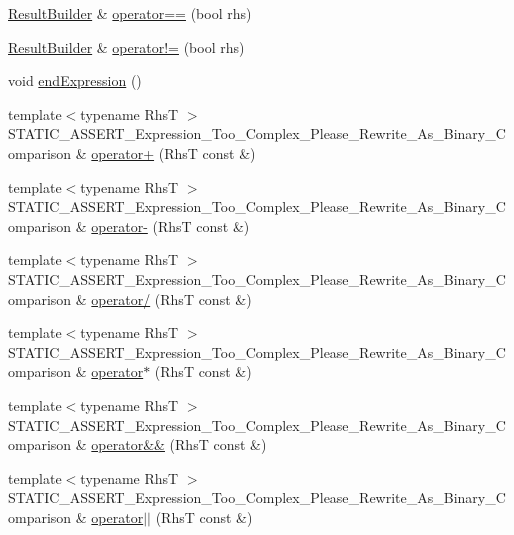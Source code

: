 \begin{DoxyCompactItemize}
\item 
\hyperlink{class_catch_1_1_result_builder}{Result\+Builder} \& \hyperlink{class_catch_1_1_expression_lhs_a6001030bcfbabc3981013ddffb3e3bb6}{operator==} (bool rhs)
\item 
\hyperlink{class_catch_1_1_result_builder}{Result\+Builder} \& \hyperlink{class_catch_1_1_expression_lhs_a71e48da9a894962e8b32a8af5359a4df}{operator!=} (bool rhs)
\item 
void \hyperlink{class_catch_1_1_expression_lhs_a13d2551a927790284fb5ddf1ee2c9079}{end\+Expression} ()
\item 
{\footnotesize template$<$typename RhsT $>$ }\\S\+T\+A\+T\+I\+C\+\_\+\+A\+S\+S\+E\+R\+T\+\_\+\+Expression\+\_\+\+Too\+\_\+\+Complex\+\_\+\+Please\+\_\+\+Rewrite\+\_\+\+As\+\_\+\+Binary\+\_\+\+Comparison \& \hyperlink{class_catch_1_1_expression_lhs_a29ffb8417e977f0a98c0eb537a7ca5af}{operator+} (RhsT const \&)
\item 
{\footnotesize template$<$typename RhsT $>$ }\\S\+T\+A\+T\+I\+C\+\_\+\+A\+S\+S\+E\+R\+T\+\_\+\+Expression\+\_\+\+Too\+\_\+\+Complex\+\_\+\+Please\+\_\+\+Rewrite\+\_\+\+As\+\_\+\+Binary\+\_\+\+Comparison \& \hyperlink{class_catch_1_1_expression_lhs_a19ef0a33442bb18efef1ec65102151d1}{operator-\/} (RhsT const \&)
\item 
{\footnotesize template$<$typename RhsT $>$ }\\S\+T\+A\+T\+I\+C\+\_\+\+A\+S\+S\+E\+R\+T\+\_\+\+Expression\+\_\+\+Too\+\_\+\+Complex\+\_\+\+Please\+\_\+\+Rewrite\+\_\+\+As\+\_\+\+Binary\+\_\+\+Comparison \& \hyperlink{class_catch_1_1_expression_lhs_a37d50565046ac9b1c9159a7c0cf88a1e}{operator/} (RhsT const \&)
\item 
{\footnotesize template$<$typename RhsT $>$ }\\S\+T\+A\+T\+I\+C\+\_\+\+A\+S\+S\+E\+R\+T\+\_\+\+Expression\+\_\+\+Too\+\_\+\+Complex\+\_\+\+Please\+\_\+\+Rewrite\+\_\+\+As\+\_\+\+Binary\+\_\+\+Comparison \& \hyperlink{class_catch_1_1_expression_lhs_a9a94294c22449f62087862ef911e6291}{operator$\ast$} (RhsT const \&)
\item 
{\footnotesize template$<$typename RhsT $>$ }\\S\+T\+A\+T\+I\+C\+\_\+\+A\+S\+S\+E\+R\+T\+\_\+\+Expression\+\_\+\+Too\+\_\+\+Complex\+\_\+\+Please\+\_\+\+Rewrite\+\_\+\+As\+\_\+\+Binary\+\_\+\+Comparison \& \hyperlink{class_catch_1_1_expression_lhs_acbda1f937f8bd5b9da649626cc0b0f54}{operator\&\&} (RhsT const \&)
\item 
{\footnotesize template$<$typename RhsT $>$ }\\S\+T\+A\+T\+I\+C\+\_\+\+A\+S\+S\+E\+R\+T\+\_\+\+Expression\+\_\+\+Too\+\_\+\+Complex\+\_\+\+Please\+\_\+\+Rewrite\+\_\+\+As\+\_\+\+Binary\+\_\+\+Comparison \& \hyperlink{class_catch_1_1_expression_lhs_a6932b72da79d6c6b03d867772ceac61b}{operator$\vert$$\vert$} (RhsT const \&)
\end{DoxyCompactItemize}


